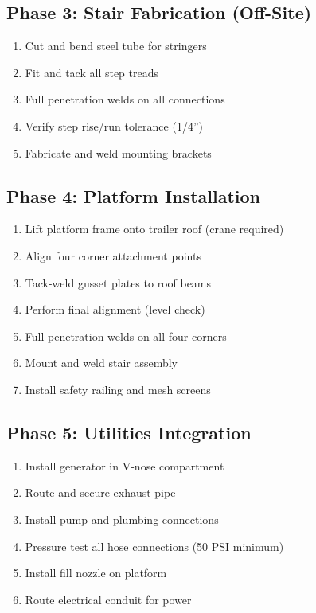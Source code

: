 \documentclass[11pt,letter]{article}
\begin{document}
\subsection{Phase 3: Stair Fabrication (Off-Site)}
\begin{enumerate}
  \item Cut and bend steel tube for stringers
  \item Fit and tack all step treads
  \item Full penetration welds on all connections
  \item Verify step rise/run tolerance (\textpm{}1/4'')
  \item Fabricate and weld mounting brackets
\end{enumerate}

\subsection{Phase 4: Platform Installation}
\begin{enumerate}
  \item Lift platform frame onto trailer roof (crane required)
  \item Align four corner attachment points
  \item Tack-weld gusset plates to roof beams
  \item Perform final alignment (level check)
  \item Full penetration welds on all four corners
  \item Mount and weld stair assembly
  \item Install safety railing and mesh screens
\end{enumerate}

\subsection{Phase 5: Utilities Integration}
\begin{enumerate}
  \item Install generator in V-nose compartment
  \item Route and secure exhaust pipe
  \item Install pump and plumbing connections
  \item Pressure test all hose connections (50 PSI minimum)
  \item Install fill nozzle on platform
  \item Route electrical conduit for power
\end{enumerate}
\end{document}
